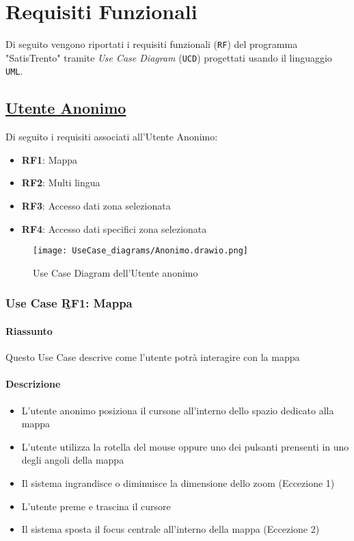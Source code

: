 \chapter{Requisiti Funzionali}
\label{ch:requisitiFunzionali}

Di seguito vengono riportati i requisiti funzionali (\texttt{RF}) del programma "SatisTrento" tramite \textit{Use Case Diagram} (\texttt{UCD}) progettati usando il linguaggio \texttt{UML}.

\section{\underline{Utente Anonimo}}
    Di seguito i requisiti associati all'Utente Anonimo:
    \begin{itemize}
        \item \textbf{RF1}: Mappa
        \item \textbf{RF2}: Multi lingua
        \item \textbf{RF3}: Accesso dati zona selezionata
        \item \textbf{RF4}: Accesso dati specifici zona selezionata
    \end{itemize}
    \begin{figure}[H]
        \centering
        \texttt{[image: UseCase\_diagrams/Anonimo.drawio.png]}
        \caption{Use Case Diagram dell'Utente anonimo}
    \end{figure}

    \subsection{Use Case \b{RF1}: Mappa}
        \subsubsection{Riassunto}
            Questo Use Case descrive come l'utente potrà interagire con la mappa
        \subsubsection{Descrizione}
            \begin{itemize}
                \item L'utente anonimo posiziona il cursone all'interno dello spazio dedicato alla mappa
                \item L'utente utilizza la rotella del mouse oppure uno dei pulsanti prensenti in uno degli angoli della mappa
                \item Il sistema ingrandisce o diminuisce la dimensione dello zoom (Eccezione 1)
                \item L'utente preme e trascina il cursore
                \item Il sistema sposta il focus centrale all'interno della mappa (Eccezione 2)
            \end{itemize}
